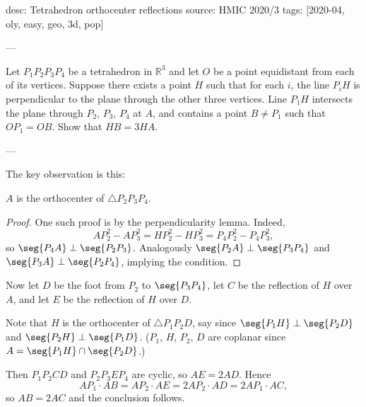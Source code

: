 desc: Tetrahedron orthocenter reflections
source: HMIC 2020/3
tags: [2020-04, oly, easy, geo, 3d, pop]

---

Let $P_1P_2P_3P_4$ be a tetrahedron in $\mathbb R^3$ and let $O$ be a point equidistant from each of its vertices. Suppose there exists a point $H$ such that for each $i$, the line $P_iH$ is perpendicular to the plane through the other three vertices. Line $P_1H$ intersects the plane through $P_2$, $P_3$, $P_4$ at $A$, and contains a point $B\ne P_1$ such that $OP_1=OB$. Show that $HB=3HA$.

---

The key observation is this:
\begin{claim*}
    $A$ is the orthocenter of $\triangle P_2P_3P_4$.
\end{claim*}
\begin{proof}
    One such proof is by the perpendicularity lemma. Indeed, \[AP_2^2-AP_3^2=HP_2^2-HP_3^2=P_4P_2^2-P_4P_3^2,\]
    so $\seg{P_4A}\perp\seg{P_2P_3}$. Analogously $\seg{P_2A}\perp\seg{P_3P_4}$ and $\seg{P_3A}\perp\seg{P_2P_4}$, implying the condition.
\end{proof}

Now let $D$ be the foot from $P_2$ to $\seg{P_3P_4}$, let $C$ be the reflection of $H$ over $A$, and let $E$ be the reflection of $H$ over $D$.

Note that $H$ is the orthocenter of $\triangle P_1P_2D$, say since $\seg{P_1H}\perp\seg{P_2D}$ and $\seg{P_2H}\perp\seg{P_1D}$. ($P_1$, $H$, $P_2$, $D$ are coplanar since $A=\seg{P_1H}\cap\seg{P_2D}$.)

Then $P_1P_2CD$ and $P_2P_3EP_4$ are cyclic, so $AE=2AD$. Hence \[AP_1\cdot AB=AP_2\cdot AE=2AP_2\cdot AD=2AP_1\cdot AC,\]
so $AB=2AC$ and the conclusion follows.
